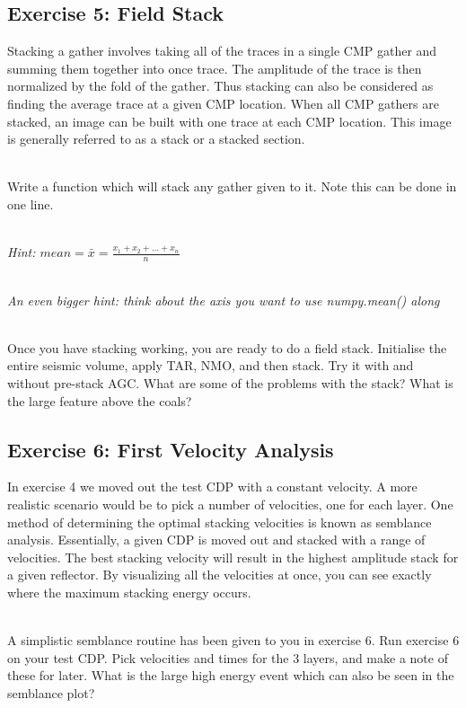 \subsection*{Exercise 5: Field Stack}
Stacking a gather involves taking all of the traces in a single CMP gather and summing them together into once trace.  The amplitude of the trace is then normalized by the fold of the gather.  Thus stacking can also be considered as finding the average trace at a given CMP location.  When all CMP gathers are stacked, an image can be built with one trace at each CMP location.  This image is generally referred to as a stack or a stacked section.
\par~\\
Write a function which will stack any gather given to it.  Note this can be done in one line. 
\par~\\
\emph{Hint: $mean = \bar{x} = \frac{x_1 + x_2 + \ldots + x_n}{n}$}
\par~\\
\emph{An even bigger hint: think about the axis you want to use numpy.mean() along}
\par~\\
Once you have stacking working, you are ready to do a field stack.  Initialise the entire seismic volume, apply TAR, NMO, and then stack.  Try it with and without pre-stack AGC. What are some of the problems with the stack? What is the large feature above the coals?
  

\subsection*{Exercise 6: First Velocity Analysis}
In exercise 4 we moved out the test CDP with a constant velocity.  A more realistic scenario would be to pick a number of velocities, one for each layer. One method of determining the optimal stacking velocities is known as semblance analysis.  Essentially, a given CDP is moved out and stacked with a range of velocities. The best stacking velocity will result in the highest amplitude stack for a given reflector.  By visualizing all the velocities at once, you can see exactly where the maximum stacking energy occurs.
\par~\\
A simplistic semblance routine has been given to you in exercise 6. Run exercise 6 on your test CDP. Pick velocities and times for the 3 layers, and make a note of these for later.  What is the large high energy event which can also be seen in the semblance plot?

